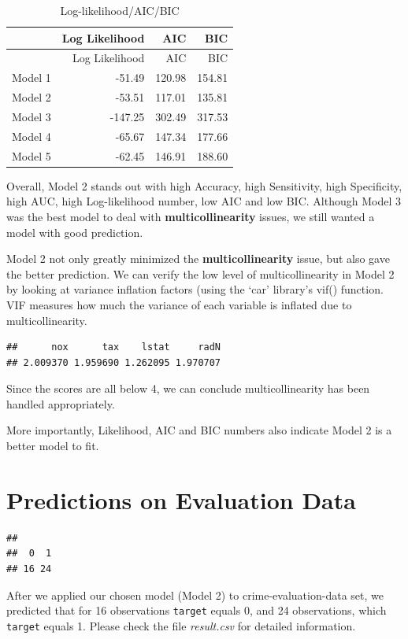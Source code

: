 \documentclass[]{article}
\begin{document}
\begin{longtable}[c]{@{}lrrr@{}}
\caption{Log-likelihood/AIC/BIC}\tabularnewline
\toprule
& Log Likelihood & AIC & BIC\tabularnewline
\midrule
\endfirsthead
\toprule
& Log Likelihood & AIC & BIC\tabularnewline
\midrule
\endhead
Model 1 & -51.49 & 120.98 & 154.81\tabularnewline
Model 2 & -53.51 & 117.01 & 135.81\tabularnewline
Model 3 & -147.25 & 302.49 & 317.53\tabularnewline
Model 4 & -65.67 & 147.34 & 177.66\tabularnewline
Model 5 & -62.45 & 146.91 & 188.60\tabularnewline
\bottomrule
\end{longtable}

Overall, Model 2 stands out with high Accuracy, high Sensitivity, high
Specificity, high AUC, high Log-likelihood number, low AIC and low BIC.
Although Model 3 was the best model to deal with
\textbf{multicollinearity} issues, we still wanted a model with good
prediction.

Model 2 not only greatly minimized the \textbf{multicollinearity} issue,
but also gave the better prediction. We can verify the low level of
multicollinearity in Model 2 by looking at variance inflation factors
(using the `car' library's vif() function. VIF measures how much the
variance of each variable is inflated due to multicollinearity.

\begin{verbatim}
##      nox      tax    lstat     radN 
## 2.009370 1.959690 1.262095 1.970707
\end{verbatim}

Since the scores are all below 4, we can conclude multicollinearity has
been handled appropriately.

More importantly, Likelihood, AIC and BIC numbers also indicate Model 2
is a better model to fit.

\section{Predictions on Evaluation
Data}\label{predictions-on-evaluation-data}

\begin{verbatim}
## 
##  0  1 
## 16 24
\end{verbatim}

After we applied our chosen model (Model 2) to crime-evaluation-data
set, we predicted that for 16 observations \texttt{target} equals 0, and
24 observations, which \texttt{target} equals 1. Please check the file
\emph{result.csv} for detailed information.
\end{document}
